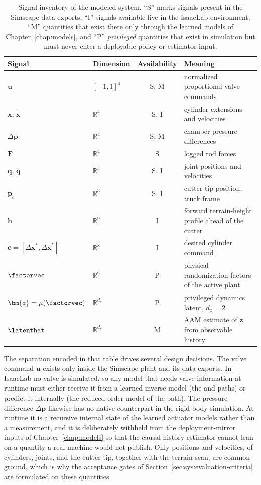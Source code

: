 \begin{table}[tb]
  \centering
  \caption{Signal inventory of the modeled system. ``S'' marks signals
  present in the Simscape data exports, ``I'' signals available live in
  the IsaacLab environment, ``M'' quantities that exist there only
  through the learned models of Chapter~\ref{chap:models}, and ``P''
  \emph{privileged} quantities that exist in simulation but must never
  enter a deployable policy or estimator input.}
  \label{tab:sys:signals}
  \small
  \begin{tabular}{llcl}
    \toprule
    Signal & Dimension & Availability & Meaning \\
    \midrule
    $\bm{u}$ & $[-1,1]^4$ & S, M & normalized proportional-valve commands \\
    $\bm{x},\, \dot{\bm{x}}$ & $\mathbb{R}^4$ & S, I & cylinder extensions and velocities \\
    $\Delta\bm{p}$ & $\mathbb{R}^4$ & S, M & chamber pressure differences \\
    $\bm{F}$ & $\mathbb{R}^4$ & S & logged rod forces \\
    $\bm{q},\, \dot{\bm{q}}$ & $\mathbb{R}^5$ & S, I & joint positions and velocities \\
    $\bm{p}_c$ & $\mathbb{R}^3$ & S, I & cutter-tip position, truck frame \\
    $\bm{h}$ & $\mathbb{R}^{9}$ & I & forward terrain-height profile ahead of the cutter \\
    $\bm{c} = [\Delta\bm{x}^*, \Delta\dot{\bm{x}}^*]$ & $\mathbb{R}^8$ & I & desired cylinder command \\
    $\factorvec$ & $\mathbb{R}^6$ & P & physical randomization factors of the active plant \\
    $\bm{z} = \mu(\factorvec)$ & $\mathbb{R}^{d_z}$ & P & privileged dynamics latent, $d_z = 2$ \\
    $\latenthat$ & $\mathbb{R}^{d_z}$ & M & AAM estimate of $\bm{z}$ from observable history \\
    \bottomrule
  \end{tabular}
\end{table}

The separation encoded in that table drives several design decisions.
The valve command $\bm{u}$ exists only inside the Simscape plant and
its data exports. In IsaacLab no valve is simulated, so any model that
needs valve information at runtime must either receive it from a
learned inverse model (the \ppoIDFD{} and \ppoIDAAMFD{} paths) or
predict it internally (the reduced-order model of the \ppoROM{} path).
The pressure difference $\Delta\bm{p}$ likewise has no native
counterpart in the rigid-body simulation. At runtime it is a recursive
internal state of the learned actuator models rather than a
measurement, and it is deliberately withheld from the deployment-mirror
inputs of Chapter~\ref{chap:models} so that the causal history estimator
cannot lean on a quantity a real machine would not publish. Only
positions and velocities, of cylinders, joints, and the cutter tip,
together with the terrain scan, are common ground, which is why the
acceptance gates of Section~\ref{sec:sys:evaluation-criteria} are formulated on these quantities.

